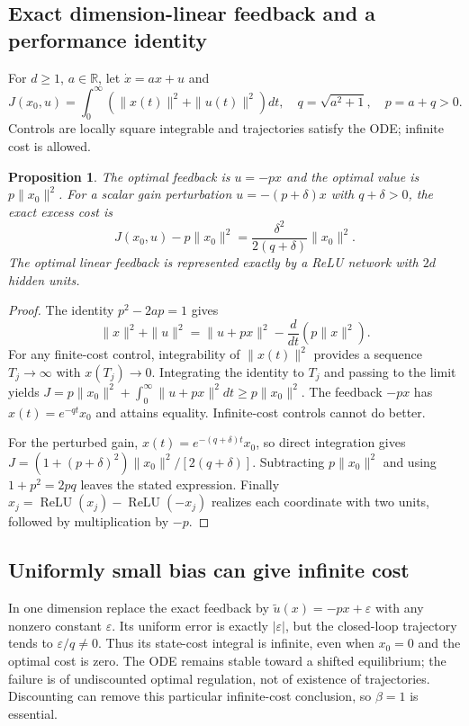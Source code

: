 \documentclass[11pt]{article}
\newtheorem{proposition}{Proposition}
\begin{document}
\subsection{Exact dimension-linear feedback and a performance identity}
For $d\ge1$, $a\in\mathbb R$, let $\dot x=ax+u$ and
\[
 J(x_0,u)=\int_0^\infty(\|x(t)\|^2+\|u(t)\|^2)dt,
 \quad q=\sqrt{a^2+1},\quad p=a+q>0.
\]
Controls are locally square integrable and trajectories satisfy the ODE; infinite cost is allowed.
\begin{proposition}
The optimal feedback is $u=-px$ and the optimal value is $p\|x_0\|^2$. For a scalar gain perturbation $u=-(p+\delta)x$ with $q+\delta>0$, the exact excess cost is
\[
 J(x_0,u)-p\|x_0\|^2=\frac{\delta^2}{2(q+\delta)}\|x_0\|^2.
\]
The optimal linear feedback is represented exactly by a ReLU network with $2d$ hidden units.
\end{proposition}
\begin{proof}
The identity $p^2-2ap=1$ gives
\[
 \|x\|^2+\|u\|^2=\|u+px\|^2-\frac{d}{dt}(p\|x\|^2).
\]
For any finite-cost control, integrability of $\|x(t)\|^2$ provides a sequence $T_j\to\infty$ with $x(T_j)\to0$. Integrating the identity to $T_j$ and passing to the limit yields $J=p\|x_0\|^2+\int_0^\infty\|u+px\|^2dt\ge p\|x_0\|^2$. The feedback $-px$ has $x(t)=e^{-qt}x_0$ and attains equality. Infinite-cost controls cannot do better.

For the perturbed gain, $x(t)=e^{-(q+\delta)t}x_0$, so direct integration gives $J=(1+(p+\delta)^2)\|x_0\|^2/[2(q+\delta)]$. Subtracting $p\|x_0\|^2$ and using $1+p^2=2pq$ leaves the stated expression. Finally $x_j=\operatorname{ReLU}(x_j)-\operatorname{ReLU}(-x_j)$ realizes each coordinate with two units, followed by multiplication by $-p$.
\end{proof}
\subsection{Uniformly small bias can give infinite cost}
In one dimension replace the exact feedback by $\widetilde u(x)=-px+\varepsilon$ with any nonzero constant $\varepsilon$. Its uniform error is exactly $|\varepsilon|$, but the closed-loop trajectory tends to $\varepsilon/q\ne0$. Thus its state-cost integral is infinite, even when $x_0=0$ and the optimal cost is zero. The ODE remains stable toward a shifted equilibrium; the failure is of undiscounted optimal regulation, not of existence of trajectories. Discounting can remove this particular infinite-cost conclusion, so $\beta=1$ is essential.
\end{document}
